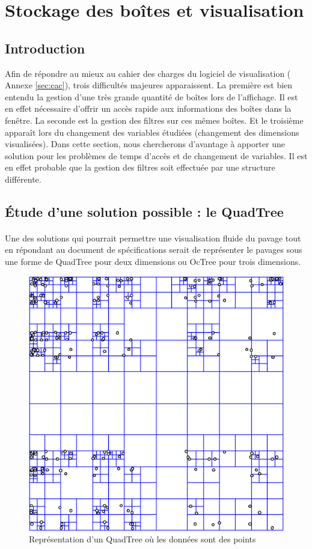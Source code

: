 \section{Stockage des boîtes et visualisation}\label{sec:vis}
\subsection{Introduction}
 Afin de répondre au mieux au cahier des charges du logiciel de visualisation (\cf{} Annexe \ref{sec:cac}), trois difficultés majeures apparaissent. La première est bien entendu la gestion d'une très grande quantité de boîtes lors de l'affichage. Il est en effet nécessaire d'offrir un accès rapide aux informations des boîtes dans la fenêtre. La seconde est la gestion des filtres sur ces mêmes boîtes. Et le troisième apparaît lors du changement des variables étudiées (changement des dimensions visualisées). Dans cette section, nous chercherons d'avantage à apporter une solution pour les problèmes de temps d'accès et de changement de variables. Il est en effet probable que la gestion des filtres soit effectuée par une structure différente.


\subsection{\'Etude d'une solution possible : le QuadTree}
\paragraph{}Une des solutions qui pourrait permettre une visualisation fluide du pavage tout en répondant au document de spécifications serait de représenter le pavages sous une forme de QuadTree pour deux dimensions ou OcTree pour trois dimensions.
\begin{figure}[htbp]
\centering
\includegraphics[scale=0.50]{img/quadtree}
\caption{Représentation d'un QuadTree où les données sont des points}

\end{figure}


